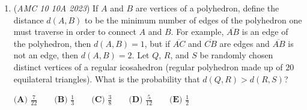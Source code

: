 \begin{enumerate}
$\textbf{(A)}~\frac{13 \sqrt{3}}{3}\qquad\textbf{(B)}~\frac{216 \sqrt{3}}{49}\qquad\textbf{(C)}~\frac{9 \sqrt{3}}{2} \qquad\textbf{(D)}~ \frac{14 \sqrt{3}}{3}\qquad\textbf{(E)}~\frac{243 \sqrt{3}}{49}$


	\item (\textit{AMC 10 10A 2023}) If $A$ and $B$ are vertices of a polyhedron, define the distance $d(A, B)$ to be the minimum number of edges of the polyhedron one must traverse in order to connect $A$ and $B$. For example, $\overline{AB}$ is an edge of the polyhedron, then $d(A, B) = 1$, but if $\overline{AC}$ and $\overline{CB}$ are edges and $\overline{AB}$ is not an edge, then $d(A, B) = 2$. Let $Q$, $R$, and $S$ be randomly chosen distinct vertices of a regular icosahedron (regular polyhedron made up of $20$ equilateral triangles). What is the probability that $d(Q, R) > d(R, S)$?


 $\textbf{(A) }\frac{7}{22}\qquad\textbf{(B) }\frac{1}{3}\qquad\textbf{(C) }\frac{3}{8}\qquad\textbf{(D) }\frac{5}{12}\qquad\textbf{(E) }\frac{1}{2}$


\end{enumerate}